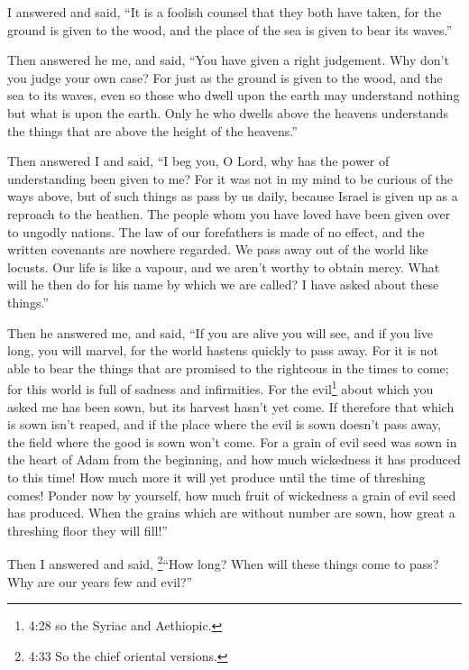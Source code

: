  I answered and said, ``It is a foolish counsel that they
both have taken, for the ground is given to the wood, and the place of
the sea is given to bear its waves.''

 Then answered he me, and said, ``You have given a right
judgement. Why don't you judge your own case?  For just as
the ground is given to the wood, and the sea to its waves, even so those
who dwell upon the earth may understand nothing but what is upon the
earth. Only he who dwells above the heavens understands the things that
are above the height of the heavens.''

 Then answered I and said, ``I beg you, O Lord, why has the
power of understanding been given to me?  For it was not in
my mind to be curious of the ways above, but of such things as pass by
us daily, because Israel is given up as a reproach to the heathen. The
people whom you have loved have been given over to ungodly nations. The
law of our forefathers is made of no effect, and the written covenants
are nowhere regarded.  We pass away out of the world like
locusts. Our life is like a vapour, and we aren't worthy to obtain
mercy.  What will he then do for his name by which we are
called? I have asked about these things.''

 Then he answered me, and said, ``If you are alive you will
see, and if you live long, you will marvel, for the world hastens
quickly to pass away.  For it is not able to bear the
things that are promised to the righteous in the times to come; for this
world is full of sadness and infirmities.  For the
evil\footnote{4:28 so the Syriac and Aethiopic.} about which you asked
me has been sown, but its harvest hasn't yet come.  If
therefore that which is sown isn't reaped, and if the place where the
evil is sown doesn't pass away, the field where the good is sown won't
come.  For a grain of evil seed was sown in the heart of
Adam from the beginning, and how much wickedness it has produced to this
time! How much more it will yet produce until the time of threshing
comes!  Ponder now by yourself, how much fruit of
wickedness a grain of evil seed has produced.  When the
grains which are without number are sown, how great a threshing floor
they will fill!''

 Then I answered and said, \footnote{4:33 So the chief
  oriental versions.}``How long? When will these things come to pass?
Why are our years few and evil?''

